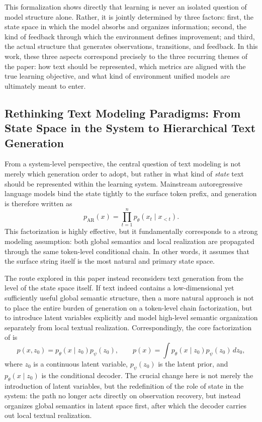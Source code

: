 This formalization shows directly that learning is never an isolated question of model structure alone. Rather, it is jointly determined by three factors: first, the state space in which the model absorbs and organizes information; second, the kind of feedback through which the environment defines improvement; and third, the actual structure that generates observations, transitions, and feedback. In this work, these three aspects correspond precisely to the three recurring themes of the paper: how text should be represented, which metrics are aligned with the true learning objective, and what kind of environment unified models are ultimately meant to enter.

\subsection{Rethinking Text Modeling Paradigms: From State Space in the System to Hierarchical Text Generation}

From a system-level perspective, the central question of text modeling is not merely which generation order to adopt, but rather in what kind of \emph{state} text should be represented within the learning system. Mainstream autoregressive language models bind the state tightly to the surface token prefix, and generation is therefore written as
\begin{equation}
p_{\mathrm{AR}}(x)=\prod_{t=1}^{n}p_\theta(x_t\mid x_{<t}).
\label{eq:after_ar_factorization}
\end{equation}
This factorization is highly effective, but it fundamentally corresponds to a strong modeling assumption: both global semantics and local realization are propagated through the same token-level conditional chain. In other words, it assumes that the surface string itself is the most natural and primary state space.

The route explored in this paper instead reconsiders text generation from the level of the state space itself. If text indeed contains a low-dimensional yet sufficiently useful global semantic structure, then a more natural approach is not to place the entire burden of generation on a token-level chain factorization, but to introduce latent variables explicitly and model high-level semantic organization separately from local textual realization. Correspondingly, the core factorization of \method is
\begin{equation}
p(x,z_0)=p_\theta(x\mid z_0)p_\psi(z_0),
\qquad
p(x)=\int p_\theta(x\mid z_0)p_\psi(z_0)\,dz_0,
\label{eq:after_hierarchical_factorization}
\end{equation}
where $z_0$ is a continuous latent variable, $p_\psi(z_0)$ is the latent prior, and $p_\theta(x\mid z_0)$ is the conditional decoder. The crucial change here is not merely the introduction of latent variables, but the redefinition of the role of state in the system: the path no longer acts directly on observation recovery, but instead organizes global semantics in latent space first, after which the decoder carries out local textual realization.

